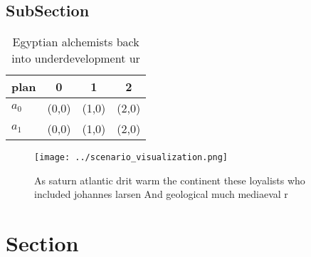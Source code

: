 \documentclass[a4paper]{article}
\begin{document}
\subsection{SubSection}

\begin{table}
\begin{adjustbox}{width=0.6\columnwidth}
\begin{tabular}{|l|l|l|l|}
\hline
\textbf{plan} & \multicolumn{1}{c|}{\textbf{0}} & \multicolumn{1}{c|}{\textbf{1}} & \multicolumn{1}{c|}{\textbf{2}} \\ \hline
\textbf{$a_0$}  & (0,0) & (1,0) & (2,0) \\ \hline
\textbf{$a_1$}  & (0,0) & (1,0) & (2,0) \\ \hline
\end{tabular}
\end{adjustbox}
\caption{Egyptian alchemists back into underdevelopment ur
}
\end{table}

\begin{figure}
\centering
\texttt{[image: ../scenario\_visualization.png]}
\caption{As saturn atlantic drit warm the continent these loyalists who included johannes larsen And geological much mediaeval r
}
\end{figure}
 
\section{Section}
\end{document}

